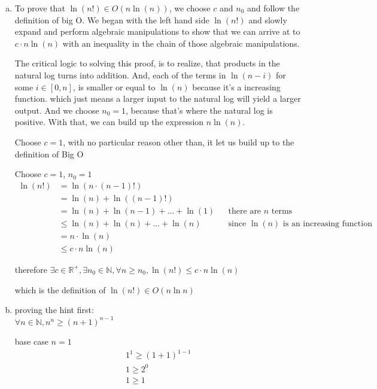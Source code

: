 \documentclass[letterpaper,11pt]{article}
\theoremstyle{plain}
\theoremstyle{definition}
\begin{document}
{\color{blue}
    \begin{enumerate}[a)]
    \item
    To prove that $\ln(n!) \in O(n \ln(n))$, we choose $c$ and $n_0$ and follow
    the definition of big O. We began with the left hand side $\ln(n!)$
    and slowly expand and perform algebraic manipulations to show that we
    can arrive at to $c \cdot n \ln(n)$ with an inequality in the chain of
    those algebraic manipulations.
    
    The critical logic to solving this proof, is to realize, that products in
    the natural log turns into addition. And, each of the terms in $\ln(n - i)$
    for some $i \in [0, n]$, is smaller or equal to $\ln(n)$ because it's a
    increasing function. which just means a larger input to the natural log
    will yield a larger output. And we choose $n_0 = 1$, because that's where
    the natural log is positive. With that, we can build up the expression
    $n \ln(n)$.
    
    Choose $c = 1$, with no particular reason other than, it let us build up
    to the definition of Big O

    Choose $c = 1$, $n_0 = 1$
    \begin{align*}
    \ln(n!) &= \ln(n \cdot (n-1)!) \\
    &= \ln(n) + \ln((n-1)!) \\
    &= \ln(n) + \ln(n-1) + \dots + \ln(1) && \text{there are } n \text{ terms} \\
    &\le \ln(n) + \ln(n) + \dots + \ln(n) && \text{since } \ln(n) \text{ is an increasing function} \\
    &= n \cdot \ln(n) \\
    &\le c \cdot n \ln(n)
    \end{align*}
     
    \noindent therefore $\exists c \in \mathbb{R}^+, \exists n_0 \in \mathbb{N}, \forall n \ge n_0, \ln(n!) \le c \cdot n \ln(n)$
     
    \noindent which is the definition of $\ln(n!) \in O(n \ln n)$

    \item
    \noindent proving the hint first: \\
    $\forall n \in \mathbb{N}, n^n \ge (n+1)^{n-1}$
     
    \noindent base case $n = 1$
    \begin{gather*}
    1^1 \ge (1+1)^{1-1} \\
    1 \ge 2^0 \\
    1 \ge 1
    \end{gather*}
     

\end{enumerate}}
\end{document}
